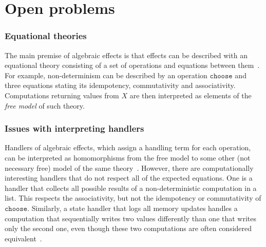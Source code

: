 \documentclass[a4paper,UKenglish]{dagrep}
\begin{document}



\section{Open problems}

\license

\newcommand{\chooseop}{\mathtt{choose}}
\newcommand{\comm}{\mathtt{comm}}
\newcommand{\assoc}{\mathtt{assoc}}
\newcommand{\idem}{\mathtt{idem}}
\newcommand{\ops}{\mathcal{O}}
\newcommand{\eqs}{\mathcal{E}}
\newcommand{\intty}{\mathtt{int}}
\newcommand{\hto}{\Rightarrow}

\subsubsection*{Equational theories}

The main premise of algebraic effects is that effects can be described with an equational theory consisting of a set of operations and equations between them~\cite{DBLP:journals/acs/PlotkinP03}. For example, non-determinism can be described by an operation $\chooseop$ and three equations stating its idempotency, commutativity and associativity. Computations returning values from $X$ are then interpreted as elements of the \emph{free model} of such theory.

\subsubsection*{Issues with interpreting handlers}

Handlers of algebraic effects, which assign a handling term for each operation, can be interpreted as homomorphisms from the free model to some other (not necessary free) model of the same theory~\cite{DBLP:journals/corr/PlotkinP13}. However, there are computationally interesting handlers that do not respect all of the expected equations. One is a handler that collects all possible results of a non-deterministic computation in a list. This respects the associativity, but not the idempotency or commutativity of $\chooseop$. Similarly, a state handler that logs all memory updates handles a computation that sequentially writes two values differently than one that writes only the second one, even though these two computations are often considered equivalent~\cite{DBLP:conf/fossacs/PlotkinP02}.
\end{document}

